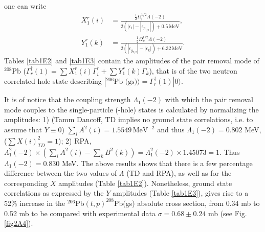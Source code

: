 one can write
\begin{equation*}
\begin{split}
X_1^r(i)&=\frac{\frac{1}{2}\Omega_i^{1/2}\Lambda(-2)}{2(|\epsilon_i|-|\epsilon_{p_{1/2}}|)+0.5\,\text{MeV}},\\ Y_1^r(k)&=\frac{\frac{1}{2}\Omega_k^{1/2}\Lambda(-2)}{2(|\epsilon_{g_{9/2}}|-|\epsilon_k|)+6.32\,\text{MeV}}.
\end{split}
\end{equation*}
Tables \ref{tab1E2} and \ref{tab1E3} contain the amplitudes of the pair removal mode of $^{208}$Pb ($\Gamma^\dagger_r(1)=\sum X^r_{1}(i)\Gamma^\dagger_i+\sum Y^r_{1}(k)\Gamma_k$), that is of the two neutron  correlated hole state describing $|^{206}\text{Pb (gs)}\rangle=\Gamma^\dagger_r(1)|0\rangle$. 


It is of notice that the coupling strength $\Lambda_1 (-2)$ with which the pair removal mode couples to the single-particle (-hole) states is calculated by normalizing the amplitudes: 1) (Tamm Dancoff, TD implies no ground state correlations, i.e. to assume that $Y\equiv0$) $\sum_iA^2(i)=1.5549 \,\text{MeV}^{-2}$ and thus $\Lambda_1 (-2)=0.802$ MeV, ($\sum X(i)^2_{TD}=1$); 2) RPA, $\Lambda_1^2 (-2)\times(\sum_i A^2(i)-\sum_k B^2(k))=\Lambda_1^2(-2)\times1.45073=1$. Thus $\Lambda_1(-2)=0.830$ MeV. The above results shows that there is a few percentage difference between the two values of $\Lambda$ (TD and RPA), as well as for the corresponding $X$ amplitudes (Table \ref{tab1E2}). Nonetheless, ground state correlations as expressed by the $Y$ amplitudes (Table \ref{tab1E3}), gives rise to a 52\% increase in the $^{206}$Pb$(t,p)^{208}$Pb(gs) absolute cross section, from 0.34 mb to 0.52 mb to be compared with experimental data $\sigma=0.68\pm 0.24$ mb (see Fig. \ref{fig2A4}).


